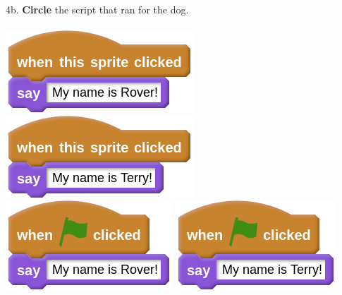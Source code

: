 \documentclass[letterpaper,12pt]{article}
\begin{document}
\noindent 4b. \textbf{Circle} the script that ran for the dog. \\ \\
\includegraphics[scale=.4,valign=t]{q4_script0.png} \hspace{1cm}
\includegraphics[scale=.4,valign=t]{q4_script1.png} \hspace{1cm}
\includegraphics[scale=.4,valign=t]{q4_script2.png} \hspace{1cm}
\includegraphics[scale=.4,valign=t]{q4_script3.png} \hspace{1cm}
\vspace{1cm}

\noindent \dotfill
\end{document}
